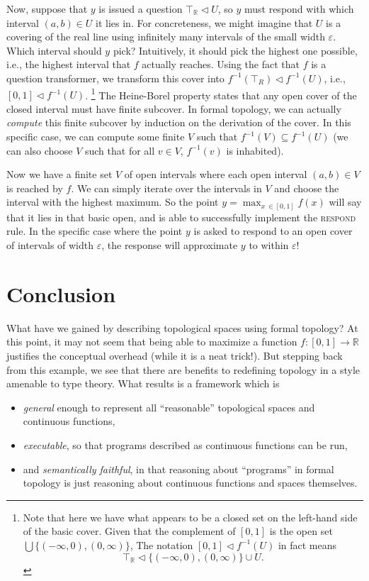 \documentclass{article}
\newcommand{\cov}{\vartriangleleft}
\newcommand{\R}{\mathbb{R}}
\newcommand{\irule}[1]{\textsc{#1}}
\begin{document}
Now, suppose that $y$ is issued a question $\top_\R \cov U$, so $y$ must respond with which interval $(a, b) \in U$ it lies in. For concreteness, we might imagine that $U$ is a covering of the real line using infinitely many intervals of the small width $\varepsilon$. Which interval should $y$ pick? Intuitively, it should pick the highest one possible, i.e., the highest interval that $f$ actually reaches. Using the fact that $f$ is a question transformer, we transform this cover into $f^{-1}(\top_R) \cov f^{-1}(U)$, i.e., $[0, 1] \cov f^{-1}(U)$.
\footnote{Note that here we have what appears to be a closed set on the left-hand side of the basic cover. Given that the complement of $[0,1]$ is the open set $\bigcup \{(-\infty, 0), (0, \infty)\}$, The notation $[0,1] \cov f^{-1}(U)$ in fact means
\[
\top_\R \cov \{(-\infty, 0), (0, \infty)\} \cup U.
\]
}
The Heine-Borel property states that any open cover of the closed interval must have finite subcover. In formal topology, we can actually \emph{compute} this finite subcover by induction on the derivation of the cover. In this specific case, we can compute some finite $V$ such that $f^{-1}(V) \subseteq f^{-1}(U)$ (we can also choose $V$ such that for all $v \in V$, $f^{-1}(v)$ is inhabited).

Now we have a finite set $V$ of open intervals where each open interval $(a, b) \in V$ is reached by $f$. We can simply iterate over the intervals in $V$ and choose the interval with the highest maximum. So the point $y = \max_{x\ \in [0,1]} f(x)$ will say that it lies in that basic open, and is able to successfully implement the \irule{respond} rule. In the specific case where the point $y$ is asked to respond to an open cover of intervals of width $\varepsilon$, the response will approximate $y$ to within $\varepsilon$!

\section{Conclusion}

What have we gained by describing topological spaces using formal topology? At this point, it may not seem that being able to maximize a function $f : [0, 1] \to \R$ justifies the conceptual overhead (while it is a neat trick!). But stepping back from this example, we see that there are benefits to redefining topology in a style amenable to type theory. What results is a framework which is
\begin{itemize}
\item \emph{general} enough to represent all ``reasonable''  topological spaces and continuous functions,
\item \emph{executable}, so that programs described as continuous functions can be run,
\item and \emph{semantically faithful}, in that reasoning about ``programs'' in formal topology is just reasoning about continuous functions and spaces themselves.
\end{itemize}
\end{document}
